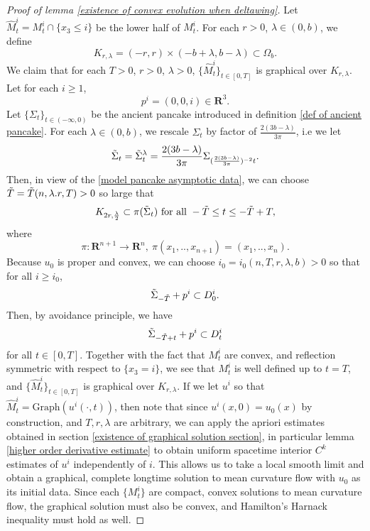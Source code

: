 \documentclass[pdflatex,sn-mathphys-num]{sn-jnl}%
\begin{document}
\begin{proof}[Proof of lemma \ref{existence of convex evolution when deltawing}]
Let $\hat{M}_t^i = M_t^i \cap \{x_3 \leq i \}$ be the lower half of $M_t^i$. For each $r > 0$, $\lambda \in (0, b)$, we define
\begin{equation}\label{def of domain2}
    K_{r, \lambda} = (-r, r) \times (-b + \lambda, b - \lambda) \subset \Omega_b.
\end{equation}
We claim that for each $T > 0$, $r > 0$, $\lambda > 0$, $\{\hat{M}^i_t\}_{t \in [0, T]}$ is graphical over $K_{r, \lambda}$. Let for each $i\geq 1$, 
\begin{equation}
    p^i = (0, 0, i) \in \mathbf{R}^3.
\end{equation}
Let $\{\Sigma_t\}_{t \in (-\infty, 0)}$ be the ancient pancake introduced in definition \ref{def of ancient pancake}. For each $\lambda \in (0, b)$, we rescale $\Sigma_t$ by factor of $\frac{2(3b - \lambda)}{3\pi}$, i.e we let
\begin{equation}
    \Tilde{\Sigma}_t=\Tilde{\Sigma}^{\lambda}_t = \frac{2(3b - \lambda)}{3\pi}\Sigma_{(\frac{2(3b - \lambda)}{3\pi})^{-2}t}.
\end{equation}
Then, in view of the \eqref{model pancake asymptotic data}, we can choose $\Tilde{T} = \Tilde{T}(n, \lambda. r, T) > 0$ so large that 
\begin{equation}
    K_{2r, \frac{\lambda}{2}} \subset \pi(\Tilde{\Sigma}_t) \text{ for all }-\Tilde{T} \leq t \leq -\Tilde{T} + T,
\end{equation}
where 
\begin{equation}
    \pi : \mathbf{R}^{n+1} \to \mathbf{R}^n, \ \pi(x_1,..,x_{n+1}) = (x_1,..,x_n).
\end{equation}
Because $u_0$ is proper and convex, we can choose $i_0 = i_0(n, T, r, \lambda, b) > 0$ so that for all $i \geq i_0$, 
\begin{equation}
    \Tilde{\Sigma}_{-\Tilde{T}} + p^i \subset D^i_0.
\end{equation}
Then, by avoidance principle, we have
\begin{equation}
    \Tilde{\Sigma}_{-\Tilde{T} + t} + p^i \subset D^i_t
\end{equation}
for all $t \in [0,T].$ Together with the fact that $M^i_t$ are convex, and reflection symmetric with respect to $\{x_3 = i\}$, we see that $M^i_t$ is well defined up to $t= T$, and $\{\hat{M}^i_t\}_{t \in [0, T]}$ is graphical over $K_{r, \lambda}$. If we let $u^i$ so that $\hat{M}^i_t = \text{Graph}(u^i(\cdot, t))$, then note that since $u^i(x, 0) = u_0(x)$ by construction, and $T, r, \lambda$ are arbitrary, we can apply the apriori estimates obtained in section \ref{existence of graphical solution section}, in particular lemma \ref{higher order derivative estimate} to obtain uniform spacetime interior $C^k$ estimates of $u^i$ independently of $i$. This allows us to take a local smooth limit and obtain a graphical, complete longtime solution to mean curvature flow with $u_0$ as its initial data. Since each $\{M^i_t\}$ are compact, convex solutions to mean curvature flow, the graphical solution must also be convex, and Hamilton's Harnack inequality must hold as well.
\end{proof}
\end{document}
